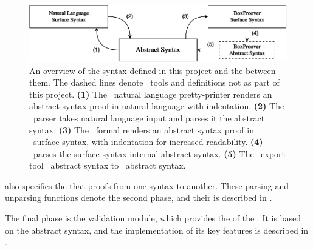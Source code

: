 \documentclass[BA.tex]{subfiles}
\begin{document}
\begin{figure}[!ht]
\includegraphics[width=\textwidth]{imports/SyntaxOverview}
\caption[Overview of  syntax]{An overview of the syntax
defined in this project and the  between them. The dashed
lines denote \bp\ tools and definitions not  as part of
this project.
{\bf (1)} The \tool\ natural language pretty-printer renders an abstract
syntax proof in natural language with indentation.
{\bf (2)} The \tool\ parser takes natural language input and parses it
 the abstract syntax.
{\bf (3)} The \tool\ formal  renders an abstract 
syntax proof in \bp\ surface syntax, with indentation for increased
readability.
{\bf (4)} \bp\ parses the surface syntax  internal abstract
syntax.
{\bf (5)} The \bp\ export tool  \bp\ abstract syntax to
\tool\ abstract syntax.
}
\label{syntaxes}
\end{figure}

 also specifies the  that 
 proofs from one syntax to another. These parsing and
 unparsing functions denote the second phase, and 
 their  is described in .

 The final phase is the validation module, which provides the
  of the \tool. It is based on the abstract syntax,
 and the implementation of its key features is described in . 
\end{document}

